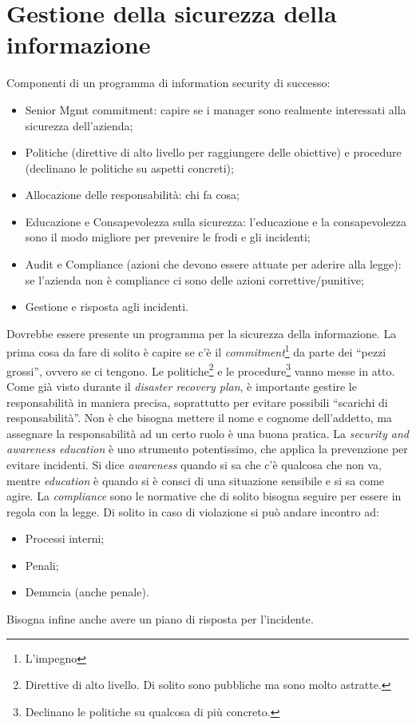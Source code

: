 \section{Gestione della sicurezza della informazione}

Componenti di un programma di information security di successo:

\begin{itemize}
\item Senior Mgmt commitment: capire se i manager sono realmente interessati
alla sicurezza dell'azienda;
\item Politiche (direttive di alto livello per raggiungere delle obiettive) e
procedure (declinano le politiche su aspetti concreti);
\item Allocazione delle responsabilità: chi fa cosa;
\item Educazione e Consapevolezza sulla sicurezza: l'educazione e la
consapevolezza sono il modo migliore per prevenire le frodi e gli incidenti;
\item Audit e Compliance (azioni che devono essere attuate per aderire alla
legge): se l'azienda non è compliance ci sono delle azioni correttive/punitive;
\item Gestione e risposta agli incidenti.
\end{itemize}

Dovrebbe essere presente un programma per la sicurezza della informazione. La
prima cosa da fare di solito è capire se c'è il
\textit{commitment}\footnote{L'impegno} da parte dei ``pezzi grossi'', ovvero
se ci tengono. Le politiche\footnote{Direttive di alto livello. Di solito sono
pubbliche ma sono molto astratte.} e le procedure\footnote{Declinano le
politiche su qualcosa di più concreto.} vanno messe in atto. Come già visto
durante il \textit{disaster recovery plan}, è importante gestire le
responsabilità in maniera precisa, soprattutto per evitare possibili ``scarichi
di responsabilità''. Non è che bisogna mettere il nome e cognome dell'addetto,
ma assegnare la responsabilità ad un certo ruolo è una buona pratica. La
\textit{security and awareness education} è uno strumento potentissimo, che
applica la prevenzione per evitare incidenti. Si dice \textit{awareness} quando
si sa che c'è qualcosa che non va, mentre \textit{education} è quando si è
consci di una situazione sensibile e si sa come agire.
La \textit{compliance} sono le normative che di solito bisogna seguire per
essere in regola con la legge. Di solito in caso di violazione si può andare
incontro ad:
\begin{itemize}
  \item Processi interni;
  \item Penali;
  \item Denuncia (anche penale).
\end{itemize}
Bisogna infine anche avere un piano di risposta per l'incidente.

